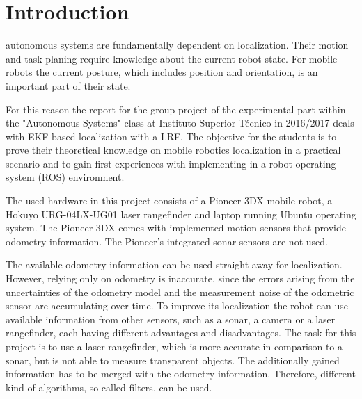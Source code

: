\section{Introduction}
\label{sec:Introduction}


% 
% 
% 
% 
 autonomous systems are fundamentally dependent on localization. Their motion and task planing require knowledge about the current robot state. For mobile robots the current posture, which includes position and orientation, is an important part of their state. 

For this reason the report for the group project of the experimental part within the "Autonomous Systems" class at Instituto Superior T\'{e}cnico in 2016/2017 deals with EKF-based localization with a LRF. The objective for the students is to prove their theoretical knowledge on mobile robotics localization in a practical scenario and to gain first experiences with implementing in a robot operating system (ROS) environment. 

The used hardware in this project consists of a Pioneer 3DX mobile robot, a Hokuyo URG-04LX-UG01 laser rangefinder and laptop running Ubuntu operating system. The Pioneer 3DX comes with implemented motion sensors that provide odometry information. The Pioneer's integrated sonar sensors are not used.

The available odometry information can be used straight away for localization. However, relying only on odometry is inaccurate, since the errors arising from the uncertainties of the odometry model and the measurement noise of the odometric sensor are accumulating over time. To improve its  localization the robot can use available information from other sensors, such as a sonar, a camera or a laser rangefinder, each having different advantages and disadvantages.  The task for this project is to use a laser rangefinder, which is more accurate in comparison to a sonar, but is not able to measure transparent objects. The additionally gained information has to be merged with the odometry information. Therefore, different kind of algorithms, so called filters, can be used.

